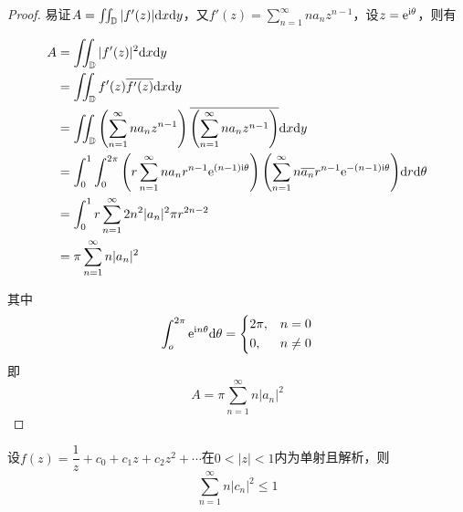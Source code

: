 \begin{proof}
    
    易证$A = \iint_{\mathbb{D}}{|f'(z)|}\mathrm{d} x\mathrm{d} y$，又$f'(z) = \sum\limits_{n = 1}^{\infty}{na_nz^{n - 1}}$，设$z = \mathrm{e}^{\mathrm{i}\theta}$，则有

    \begin{align*}
        A & = \iint_{\mathbb{D}}{|f'(z)|^2}\mathrm{d} x\mathrm{d} y \\ 
          & = \iint_{\mathbb{D}}{f'(z)\overline{{f'(z)}}}\mathrm{d} x\mathrm{d} y \\
          & = \iint_{\mathbb{D}}{\left( \sum\limits_{n = 1}^{\infty}{na_nz^{n - 1}} \right)\overline{\left( \sum\limits_{n = 1}^{\infty}{na_nz^{n - 1}} \right)}}\mathrm{d} x\mathrm{d} y \\
          & = \int_{0}^{1}{\int_{0}^{2 \pi}{\left( r\sum\limits_{n = 1}^{\infty}{na_nr^{n - 1}\mathrm{e}^{(n - 1)\mathrm{i}\theta}} \right)\left( \sum\limits_{n = 1}^{\infty}{n\overline{a_n}r^{n - 1}\mathrm{e}^{-(n - 1)\mathrm{i}\theta}} \right)}\mathrm{d} r}\mathrm{d} \theta \\
          & = \int_{0}^{1}{r\sum\limits_{n = 1}^{\infty}{2n^2|a_n|^2 \pi r^{2n - 2}}} \\
          & = \pi \sum\limits_{n = 1}^{\infty}{n|a_n|^2}
    \end{align*}

    其中
    $$
    \int_{o}^{2\pi}{\mathrm{e}^{\mathrm{i} n\theta}}\mathrm{d} \theta = 
    \left\{
        \begin{aligned}
            &2\pi, & n = 0 \\
            &0, & n \neq 0 \\
        \end{aligned}
    \right.
    $$
    即
    \[A = \pi \sum\limits_{n = 1}^{\infty}{n|a_n|^2}\]

\end{proof}


\begin{theorem}
    
    设$f(z) = \dfrac{1}{z} + c_0 + c_1 z + c_2 z
    ^2 + \cdots$在$0 < |z| < 1$内为单射且解析，则
    \[\sum\limits_{n = 1}^{\infty}{n|c_n|^2} \leq 1\]
    
\end{theorem}

